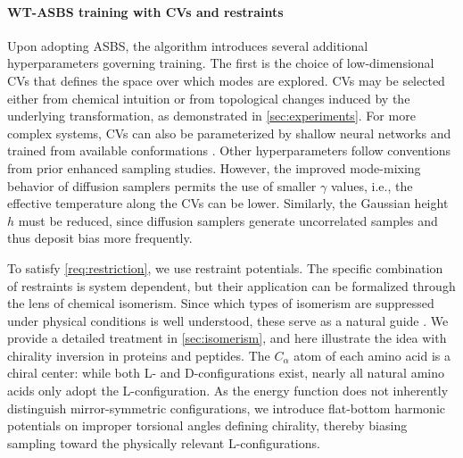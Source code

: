 \documentclass[]{fairmeta}
\theoremstyle{remark}
\begin{document}
\paragraph{WT-ASBS training with CVs and restraints}
Upon adopting ASBS, the algorithm introduces several additional hyperparameters governing training.
The first is the choice of low-dimensional CVs that defines the space over which modes are explored. CVs may be selected either from chemical intuition or from topological changes induced by the underlying transformation, as demonstrated in \cref{sec:experiments}.
For more complex systems, CVs can also be parameterized by shallow neural networks and trained from available conformations \citep{sidky2020machine,bonati2023unified}.
Other hyperparameters follow conventions from prior enhanced sampling studies.
However, the improved mode-mixing behavior of diffusion samplers permits the use of smaller $\gamma$ values, i.e., the effective temperature along the CVs can be lower.
Similarly, the Gaussian height $h$ must be reduced, since diffusion samplers generate uncorrelated samples and thus deposit bias more frequently.

To satisfy \cref{req:restriction}, we use restraint potentials.
The specific combination of restraints is system dependent, but their application can be formalized through the lens of chemical isomerism.
Since which types of isomerism are suppressed under physical conditions is well understood, these serve as a natural guide \citep{canfield2018new}.
We provide a detailed treatment in \cref{sec:isomerism}, and here illustrate the idea with chirality inversion in proteins and peptides.
The $C_\alpha$ atom of each amino acid is a chiral center: while both L- and D-configurations exist, nearly all natural amino acids only adopt the L-configuration.
As the energy function does not inherently distinguish mirror-symmetric configurations, we introduce flat-bottom harmonic potentials on improper torsional angles defining chirality, thereby biasing sampling toward the physically relevant L-configurations.
\end{document}
